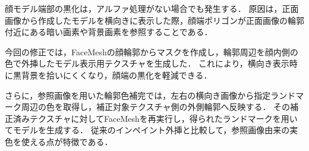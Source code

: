 \documentclass[uplatex,dvipdfmx]{jsarticle}
\begin{document}
顔モデル端部の黒化は，アルファ処理がない場合でも発生する．
原因は，正面画像から作成したモデルを横向きに表示した際，顔端ポリゴンが正面画像の輪郭付近にある暗い画素や背景画素を参照することである．

今回の修正では，FaceMeshの顔輪郭からマスクを作成し，輪郭周辺を顔内側の色で外挿したモデル表示用テクスチャを生成した．
これにより，横向き表示時に黒背景を拾いにくくなり，顔端の黒化を軽減できる．

さらに，参照画像を用いた輪郭色補完では，左右の横向き画像から指定ランドマーク周辺の色を取得し，補正対象テクスチャ側の外側輪郭へ反映する．
その補正済みテクスチャに対してFaceMeshを再実行し，得られたランドマークを用いてモデルを生成する．
従来のインペイント外挿と比較して，参照画像由来の実色を使える点が特徴である．
\end{document}
